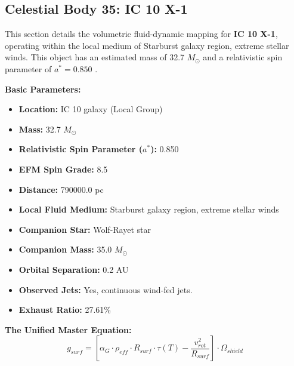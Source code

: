 \documentclass[11pt, a4paper]{article}
\begin{document}
\clearpage
\subsection{Celestial Body 35: IC 10 X-1}
This section details the volumetric fluid-dynamic mapping for \textbf{IC 10 X-1}, operating within the local medium of Starburst galaxy region, extreme stellar winds. This object has an estimated mass of 32.7 $M_{\odot}$ and a relativistic spin parameter of $a^* = 0.850$ \cite{silverman2008, simbad}.

\vspace{0.5em}
\noindent \textbf{Basic Parameters:}
\begin{itemize}
  \item \textbf{Location:} IC 10 galaxy (Local Group)
  \item \textbf{Mass:} 32.7 $M_{\odot}$
  \item \textbf{Relativistic Spin Parameter ($a^*$):} 0.850
  \item \textbf{EFM Spin Grade:} 8.5
  \item \textbf{Distance:} 790000.0 pc
  \item \textbf{Local Fluid Medium:} Starburst galaxy region, extreme stellar winds
  \item \textbf{Companion Star:} Wolf-Rayet star
  \item \textbf{Companion Mass:} 35.0 $M_{\odot}$
  \item \textbf{Orbital Separation:} 0.2 AU
  \item \textbf{Observed Jets:} Yes, continuous wind-fed jets.
  \item \textbf{Exhaust Ratio:} 27.61\%
\end{itemize}

\vspace{0.5em}
\noindent \textbf{The Unified Master Equation:}
$$ g_{surf} = \left[ \alpha_G \cdot \rho_{eff} \cdot R_{surf} \cdot \tau(T) - \frac{v_{rot}^2}{R_{surf}} \right] \cdot \Omega_{shield} $$
\end{document}
